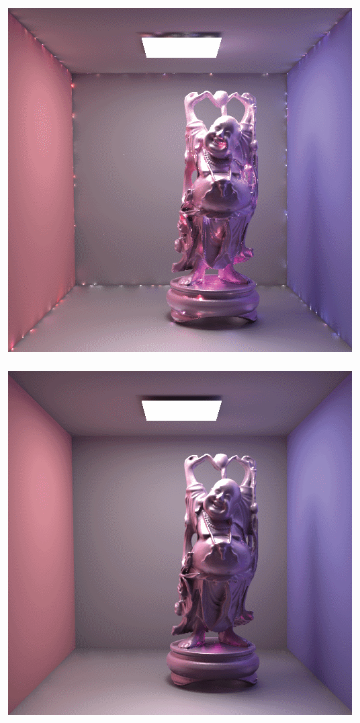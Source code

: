 \begin{figure}[htb]
    \centering
    \begin{subfigure}[b]{0.32\textwidth}
        \centering
        \includegraphics[width=1.0\linewidth]{graphics/clamping1-dachsbacher}%
        \caption{}
    \end{subfigure}%
    \hfill
    \begin{subfigure}[b]{0.32\textwidth}
        \centering
        \includegraphics[width=1.0\linewidth]{graphics/clamping2-dachsbacher}%

\end{subfigure}
\end{figure}
